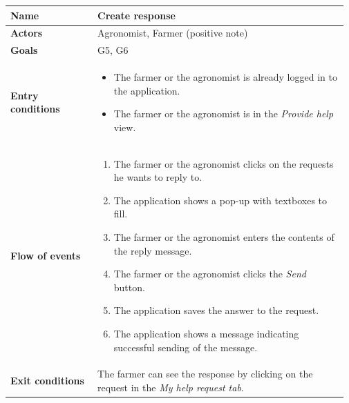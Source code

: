 \begin{longtable}{@{}p{0.25\linewidth} p{0.72\linewidth}@{}}
\toprule
	\textbf{Name}               & Create response\\
	\midrule
	\textbf{Actors}             & Agronomist, Farmer (positive note)\\
	\midrule
	\textbf{Goals}              & G5, G6 \\
	\midrule
	
	\textbf{Entry conditions}   & \begin{itemize}[leftmargin=.4cm,noitemsep,topsep=0pt,before=\vspace{-3mm},after=\vspace{-4mm}]
	    \item The farmer or the agronomist is already logged in to the application.
	    \item The farmer or the agronomist is in the \textit{Provide help} view.
	\end{itemize}\\
	\midrule
	
	\textbf{Flow of events}     & \begin{enumerate}[leftmargin=.4cm,noitemsep,topsep=0pt,before=\vspace{-3mm},after=\vspace{-4mm}]
	    \item The farmer or the agronomist clicks on the requests he wants to reply to. 
	    \item The application shows a pop-up with textboxes to fill.
	    \item The farmer or the agronomist enters the contents of the reply message.
	    \item The farmer or the agronomist clicks the \textit{Send} button.
	    \item The application saves the answer to the request.
	    \item The application shows a message indicating successful sending of the message.
	\end{enumerate}\\
	\midrule
	\textbf{Exit conditions}    & The farmer can see the response by clicking on the request in the \textit{My help request tab}. \\
	\midrule
	

\end{longtable}

